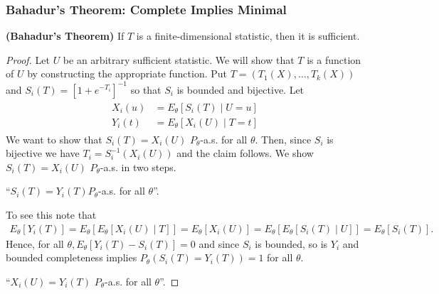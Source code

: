 \documentclass{article}
\newcommand{\bfs}[1]{\textbf{({#1}) }}
\begin{document}
\subsubsection{Bahadur's Theorem: Complete Implies Minimal}
\begin{thma}\bfs{Bahadur's Theorem}
If $T$ is a finite-dimensional  statistic, then it is  sufficient.
\end{thma} 
\begin{proof}
Let $U$ be an arbitrary sufficient statistic. We will show that $T$ is a function of $U$ by constructing the appropriate function. Put $T=\left(T_{1}(X), \ldots, T_{k}(X)\right)$ and $S_{i}(T)=\left[1+e^{-T_{i}}\right]^{-1}$ so that $S_{i}$ is bounded and bijective. Let
\begin{align*}
\begin{aligned}
X_{i}(u) &=E_{\theta}\left[S_{i}(T) \mid U=u\right] \\
Y_{i}(t) &=E_{\theta}\left[X_{i}(U) \mid T=t\right]
\end{aligned}
\end{align*}
We want to show that $S_{i}(T)=X_{i}(U)$ $P_{\theta}$-a.s. for all $\theta$. Then, since $S_{i}$ is bijective we have $T_{i}=S_{i}^{-1}\left(X_{i}(U)\right)$ and the claim follows. We show $S_{i}(T)=X_{i}(U)$ $P_{\theta}$-a.s. in two steps.

 ``$S_{i}(T)=Y_{i}(T) P_{\theta}$-a.s. for all $\theta$''.

To see this note that
\begin{align*}
E_{\theta}\left[Y_{i}(T)\right]=E_{\theta}\left[E_{\theta}\left[X_{i}(U) \mid T\right]\right]=E_{\theta}\left[X_{i}(U)\right]=E_{\theta}\left[E_{\theta}\left[S_{i}(T) \mid U\right]\right]=E_{\theta}\left[S_{i}(T)\right] .
\end{align*}
Hence, for all $\theta, E_{\theta}\left[Y_{i}(T)-S_{i}(T)\right]=0$ and since $S_{i}$ is bounded, so is $Y_{i}$ and bounded completeness implies $P_{\theta}\left(S_{i}(T)=Y_{i}(T)\right)=1$ for all $\theta$.

 ``$X_{i}(U)=Y_{i}(T)$ $P_{\theta}$-a.s. for all $\theta$''. 


\end{proof}
\end{document}
